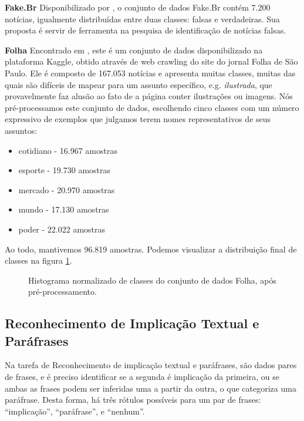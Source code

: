\documentclass[cic,tc]{iiufrgs}
\begin{document}
\textbf{Fake.Br}
Disponibilizado por \cite{fakebr:18}, o conjunto de dados Fake.Br contém 7.200 notícias, igualmente distribuídas entre duas classes: falsas e verdadeiras. Sua proposta é servir de ferramenta na pesquisa de identificação de notícias falsas.

\textbf{Folha}
Encontrado em \cite{folha-dataset}, este é um conjunto de dados disponibilizado na plataforma Kaggle, obtido através de web crawling do site do jornal Folha de São Paulo. Ele é composto de 167.053 notícias e apresenta muitas classes, muitas das quais são difíceis de mapear para um assunto específico, e.g. \emph{ilustrada}, que provavelmente faz alusão ao fato de a página conter ilustrações ou imagens. Nós pré-processamos este conjunto de dados, escolhendo cinco classes com um número expressivo de exemplos que julgamos terem nomes representativos de seus assuntos:
\begin{itemize}
    \item cotidiano - 16.967 amostras
    \item esporte - 19.730 amostras
    \item mercado - 20.970 amostras
    \item mundo - 17.130 amostras
    \item poder - 22.022 amostras
\end{itemize}

Ao todo, mantivemos 96.819 amostras. Podemos visualizar a distribuição final de classes na figura \ref{fig:folha_hist}.

\begin{figure}[h]
    \caption{Histograma normalizado de classes do conjunto de dados Folha, após pré-processamento.}
    \begin{center}
        
    \end{center}
    \label{fig:folha_hist}
\end{figure}


\subsection{Reconhecimento de Implicação Textual e Paráfrases}
Na tarefa de Reconhecimento de implicação textual e paráfrases, são dados pares de frases, e é preciso identificar se a segunda é implicação da primeira, ou se ambas as frases podem ser inferidas uma a partir da outra, o que categoriza uma paráfrase. Desta forma, há três rótulos possíveis para um par de frases: ``implicação'', ``paráfrase'', e ``nenhum''.
\end{document}
